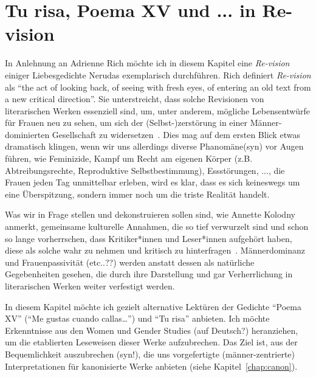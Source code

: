 \section{Tu risa, Poema XV und ... in Re-vision}


In Anlehnung an Adrienne Rich möchte ich in diesem Kapitel eine \textit{Re-vision} einiger Liebesgedichte Nerudas exemplarisch durchführen.
Rich definiert \textit{Re-vision} als ``the act of looking back, of seeing with fresh eyes, of entering an old text from a new critical direction''.
Sie unterstreicht, dass solche Revisionen von literarischen Werken essenziell sind, um, unter anderem, mögliche Lebensentwürfe für Frauen neu zu sehen, um sich der (Selbst-)zerstörung in einer Männer-dominierten Gesellschaft zu widersetzen~\cite{Rich1972}.
Dies mag auf dem ersten Blick etwas dramatisch klingen, wenn wir uns allerdings diverse Phanomäne(syn) vor Augen führen, wie Feminizide, Kampf um Recht am eigenen Körper (z.B. Abtreibungsrechte, Reproduktive Selbstbestimmung), Essstörungen, ..., die Frauen jeden Tag unmittelbar erleben, wird es klar, dass es sich keineswegs um eine Überspitzung, sondern immer noch um die triste Realität handelt.

Was wir in Frage stellen und dekonstruieren sollen sind, wie Annette Kolodny anmerkt, gemeinsame kulturelle Annahmen, die so tief verwurzelt sind und schon so lange vorherrschen, dass Kritiker*innen und Leser*innen aufgehört haben, diese als solche wahr zu nehmen und kritisch zu hinterfragen~\cite{Kolodny1980}.
Männerdominanz und Frauenpassivität (etc..??) werden anstatt dessen als natürliche Gegebenheiten gesehen, die durch ihre Darstellung und gar Verherrlichung in literarischen Werken weiter verfestigt werden.

In diesem Kapitel möchte ich gezielt alternative Lektüren der Gedichte ``Poema XV'' (``Me gustas cuando callas\ldots'') und ``Tu risa'' anbieten. 
Ich möchte Erkenntnisse aus den Women und Gender Studies (auf Deutsch?) heranziehen, um die etablierten Leseweisen dieser Werke aufzubrechen.
Das Ziel ist, aus der Bequemlichkeit auszubrechen (syn!), die uns vorgefertigte (männer-zentrierte) Interpretationen für kanonisierte Werke anbieten (siehe Kapitel~\ref{chap:canon}).

